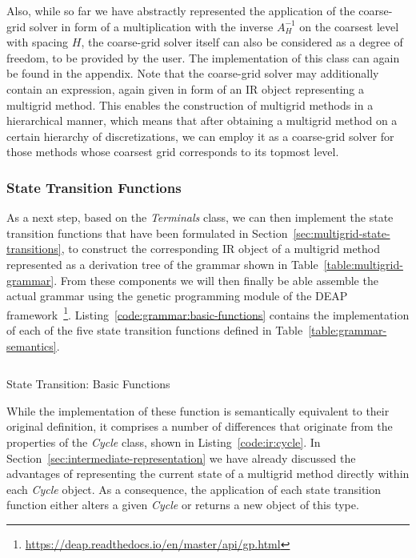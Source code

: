 Also, while so far we have abstractly represented the application of the coarse-grid solver in form of a multiplication with the inverse $A^{-1}_H$ on the coarsest level with spacing $H$, the coarse-grid solver itself can also be considered as a degree of freedom, to be provided by the user.
The implementation of this class can again be found in the appendix.
Note that the coarse-grid solver may additionally contain an expression, again given in form of an IR object representing a multigrid method.
This enables the construction of multigrid methods in a hierarchical manner, which means that after obtaining a multigrid method on a certain hierarchy of discretizations, we can employ it as a coarse-grid solver for those methods whose coarsest grid corresponds to its topmost level.

\subsubsection{State Transition Functions}
\label{sec:evostencils:state-transition-functions}
As a next step, based on the \emph{Terminals} class, we can then implement the state transition functions that have been formulated in Section~\ref{sec:multigrid-state-transitions}, to construct the corresponding IR object of a multigrid method represented as a derivation tree of the grammar shown in Table~\ref{table:multigrid-grammar}.
From these components we will then finally be able assemble the actual grammar using the genetic programming module of the DEAP framework~\footnote{\url{https://deap.readthedocs.io/en/master/api/gp.html}}.
Listing~\ref{code:grammar:basic-functions} contains the implementation of each of the five state transition functions defined in Table~\ref{table:grammar-semantics}.
\begin{listing}
	\inputminted{python}{evostencils/grammar/base.py}
	\caption{State Transition: Basic Functions}
	\label{code:grammar:basic-functions}
\end{listing}
While the implementation of these function is semantically equivalent to their original definition, it comprises a number of differences that originate from the properties of the \emph{Cycle} class, shown in Listing~\ref{code:ir:cycle}.
In Section~\ref{sec:intermediate-representation} we have already discussed the advantages of representing the current state of a multigrid method directly within each \emph{Cycle} object.
As a consequence, the application of each state transition function either alters a given \emph{Cycle} or returns a new object of this type.
